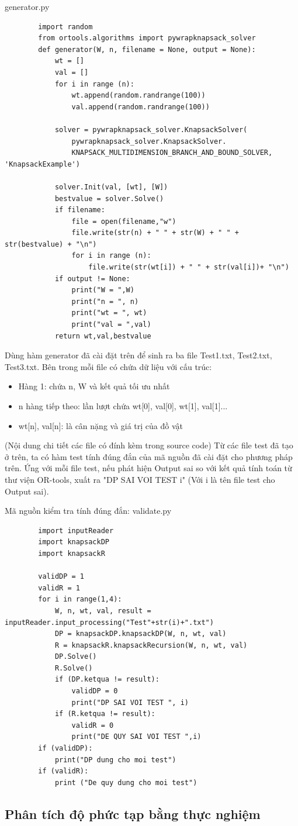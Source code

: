 \documentclass[12pt,a4paper]{report}
\begin{document}
    generator.py
    \begin{lstlisting}
        import random
        from ortools.algorithms import pywrapknapsack_solver
        def generator(W, n, filename = None, output = None):
            wt = []
            val = []
            for i in range (n):
                wt.append(random.randrange(100))
                val.append(random.randrange(100))
        
            solver = pywrapknapsack_solver.KnapsackSolver(
                pywrapknapsack_solver.KnapsackSolver.
                KNAPSACK_MULTIDIMENSION_BRANCH_AND_BOUND_SOLVER, 'KnapsackExample')
        
            solver.Init(val, [wt], [W])
            bestvalue = solver.Solve()
            if filename:
                file = open(filename,"w")
                file.write(str(n) + " " + str(W) + " " + str(bestvalue) + "\n")
                for i in range (n):
                    file.write(str(wt[i]) + " " + str(val[i])+ "\n")
            if output != None:
                print("W = ",W)
                print("n = ", n)
                print("wt = ", wt)
                print("val = ",val)
            return wt,val,bestvalue
    \end{lstlisting}
    Dùng hàm generator đã cài đặt trên để sinh ra ba file Test1.txt, Test2.txt,
    Test3.txt. Bên trong mỗi file có chứa dữ liệu với cấu trúc:
    \begin{itemize}
        \item Hàng 1: chứa n, W và kết quả tối ưu nhất
        \item n hàng tiếp theo: lần lượt chứa wt[0], val[0], wt[1], val[1]... 
        \item wt[n], val[n]: là cân nặng và giá trị của đồ vật
    \end{itemize}
    (Nội dung chi tiết các file có đính kèm trong source code)
    Từ các file test đã tạo ở trên, ta có hàm test tính đúng đắn của mã nguồn đã 
    cài đặt cho phương pháp trên. Ứng với mỗi file test, nếu phát hiện Output sai
    so với kết quả tính toán từ thư viện OR-tools, xuất ra "DP SAI VOI TEST i" (Với i
    là tên file test cho Output sai).

    Mã nguồn kiểm tra tính đúng đắn: 
    validate.py
    \begin{lstlisting}
        import inputReader
        import knapsackDP
        import knapsackR

        validDP = 1
        validR = 1
        for i in range(1,4):
            W, n, wt, val, result = inputReader.input_processing("Test"+str(i)+".txt")
            DP = knapsackDP.knapsackDP(W, n, wt, val)
            R = knapsackR.knapsackRecursion(W, n, wt, val)
            DP.Solve()
            R.Solve()
            if (DP.ketqua != result):
                validDP = 0
                print("DP SAI VOI TEST ", i)
            if (R.ketqua != result):
                validR = 0
                print("DE QUY SAI VOI TEST ",i)
        if (validDP):
            print("DP dung cho moi test")
        if (validR):
            print ("De quy dung cho moi test")
    \end{lstlisting}
    \subsection{Phân tích độ phức tạp bằng thực nghiệm}
\end{document}
